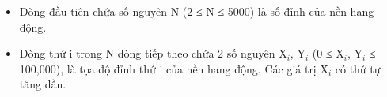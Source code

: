 \begin{itemize}
	\item Dòng đầu tiên chứa số nguyên N (2 ≤ N ≤ 5000) là số đỉnh của nền hang động.
	\item Dòng thứ i trong N dòng tiếp theo chứa 2 số nguyên X$_i$, Y$_i $ (0 ≤ X$_i$, Y$_i $ ≤ 100,000), là tọa độ đỉnh thứ i của nền hang động. Các giá trị X$_i $ có thứ tự tăng dần.
\end{itemize}

\